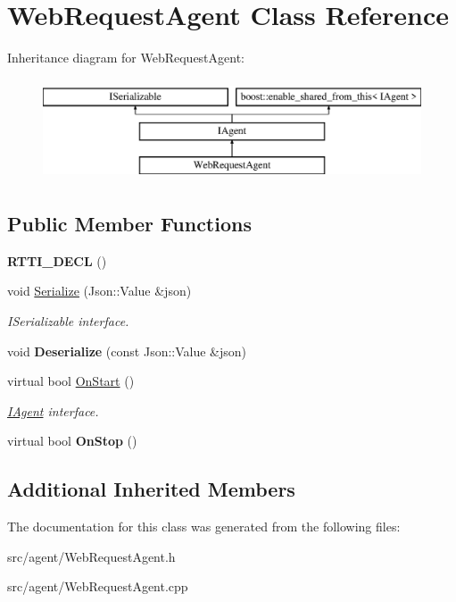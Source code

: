 \hypertarget{class_web_request_agent}{}\section{Web\+Request\+Agent Class Reference}
\label{class_web_request_agent}
Inheritance diagram for Web\+Request\+Agent\+:\begin{figure}[H]
\begin{center}
\leavevmode
\includegraphics[height=3.000000cm]{class_web_request_agent}
\end{center}
\end{figure}
\subsection*{Public Member Functions}
\begin{DoxyCompactItemize}
\item 
\mbox{\label{class_web_request_agent_a224e3a9c02767dc2406b7a9a2003170c}} 
{\bfseries R\+T\+T\+I\+\_\+\+D\+E\+CL} ()
\item 
\mbox{\label{class_web_request_agent_a566dc0ac77462b46f4cec49fea20fd73}} 
void \hyperlink{class_web_request_agent_a566dc0ac77462b46f4cec49fea20fd73}{Serialize} (Json\+::\+Value \&json)
\begin{DoxyCompactList}\small\item\em I\+Serializable interface. \end{DoxyCompactList}\item 
\mbox{\label{class_web_request_agent_a65a1623caed2f6927e242e82c97151b5}} 
void {\bfseries Deserialize} (const Json\+::\+Value \&json)
\item 
\mbox{\label{class_web_request_agent_ad40bb3bec016cb2fbc81beb00a9dc016}} 
virtual bool \hyperlink{class_web_request_agent_ad40bb3bec016cb2fbc81beb00a9dc016}{On\+Start} ()
\begin{DoxyCompactList}\small\item\em \hyperlink{class_i_agent}{I\+Agent} interface. \end{DoxyCompactList}\item 
\mbox{\label{class_web_request_agent_a5d0f27daee155b32e1a4728f5917ec2f}} 
virtual bool {\bfseries On\+Stop} ()
\end{DoxyCompactItemize}
\subsection*{Additional Inherited Members}


The documentation for this class was generated from the following files\+:\begin{DoxyCompactItemize}
\item 
src/agent/Web\+Request\+Agent.\+h\item 
src/agent/Web\+Request\+Agent.\+cpp\end{DoxyCompactItemize}
